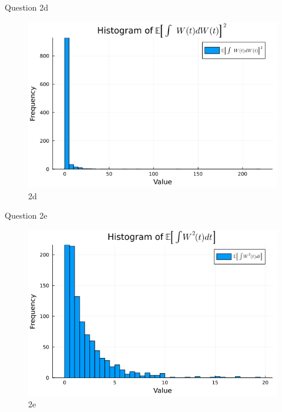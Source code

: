 \documentclass[compress,12pt]{beamer}
\begin{document}
\begin{frame}{Question 2d}
      \begin{figure}[H]
            \centering
            \includegraphics[scale=0.5]{imgs/2d.png}
            \caption{2d}
            \label{fig:2d}
      \end{figure}
\end{frame}


\begin{frame}{Question 2e}
      \begin{figure}[H]
            \centering
            \includegraphics[scale=0.5]{imgs/2e.png}
            \caption{2e}
            \label{fig:2e}
      \end{figure}

\end{frame}
\end{document}
